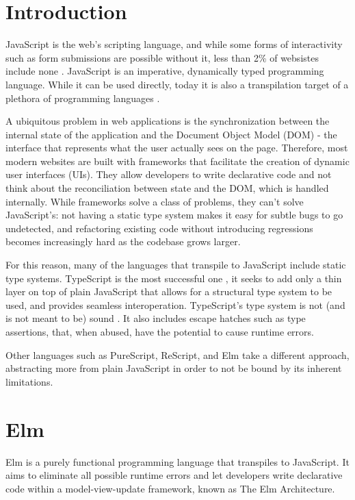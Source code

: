 \chapter*{Introduction}
\setcounter{page}{1}

JavaScript is the web's scripting language, and while some forms of interactivity such as form submissions are possible without it, less than 2\% of websistes include none \cite{noauthor_usage_nodate}. JavaScript is an imperative, dynamically typed programming language. While it can be used directly, today it is also a transpilation target of a plethora of programming languages \cite{noauthor_list_nodate}.

A ubiquitous problem in web applications is the synchronization between the internal state of the application and the Document Object Model (DOM) - the interface that represents what the user actually sees on the page. Therefore, most modern websites are built with frameworks that facilitate the creation of dynamic user interfaces (UIs). They allow developers to write declarative code and not think about the reconciliation between state and the DOM, which is handled internally. While frameworks solve a class of problems, they can't solve JavaScript's: not having a static type system makes it easy for subtle bugs to go undetected, and refactoring existing code without introducing regressions becomes increasingly hard as the codebase grows larger.

For this reason, many of the languages that transpile to JavaScript include static type systems. TypeScript is the most successful one \cite{noauthor_most_nodate}, it seeks to add only a thin layer on top of plain JavaScript that allows for a structural type system to be used, and provides seamless interoperation. TypeScript's type system is not (and is not meant to be) sound \cite{noauthor_typescript_nodate}. It also includes escape hatches such as type assertions, that, when abused, have the potential to cause runtime errors.

Other languages such as PureScript, ReScript, and Elm take a different approach, abstracting more from plain JavaScript in order to not be bound by its inherent limitations.

\chapter{Elm}
Elm is a purely functional programming language that transpiles to JavaScript. It aims to eliminate all possible runtime errors and let developers write declarative code within a model-view-update framework, known as The Elm Architecture.

